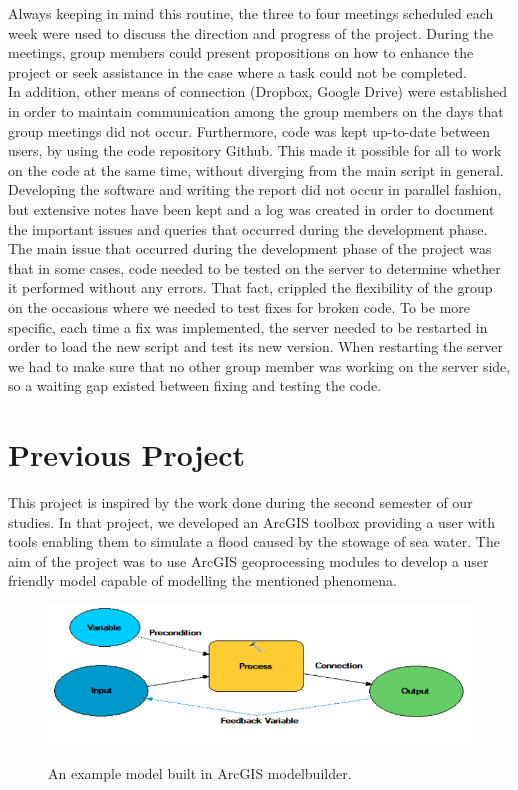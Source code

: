 Always keeping in mind this routine, the three to four meetings scheduled each week were used to discuss the direction and progress of the project. 
During the meetings, group members could present propositions on how to enhance the project or seek assistance in the case where a task could not be completed. \\
In addition, other means of connection (Dropbox, Google Drive) were established in order to maintain communication among the group members on the days that group meetings did not occur. Furthermore, code was kept up-to-date between users, by using the code repository Github. This made it possible for all to work on the code at the same time, without diverging from the main script in general. \\
Developing the software and writing the report did not occur in parallel fashion, but extensive notes have been kept and a log was created in order to document the important issues and queries that occurred during the development phase. \\

The main issue that occurred during the development phase of the project was that in some cases, code needed to be tested on the server to determine whether it performed without any errors. That fact, crippled the flexibility of the group on the occasions where we needed to test fixes for broken code. To be more specific, each time a fix was implemented, the server needed to be restarted in order to load the new script and test its new version. When restarting the server we had to make sure that no other group member was working on the server side, so a waiting gap existed between fixing and testing the code.\\

\section{Previous Project}
This project is inspired by the work done during the second semester of our studies. In that project, we developed an ArcGIS toolbox providing a user with tools enabling them to simulate a flood caused by the stowage of sea water. The aim of the project was to use ArcGIS geoprocessing modules to develop a user friendly model capable of modelling the mentioned phenomena. \\

\begin{figure}[h!]
\centering
	{\includegraphics[width=\linewidth]{gfx/Methodology/old_project.png}}
\caption{An example model built in ArcGIS modelbuilder.}
\label{fig:inputs}
\end{figure}\\

